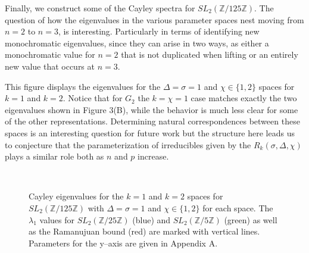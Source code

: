 \documentclass[12pt,reqno]{amsart}
\theoremstyle{remark}
\numberwithin{table}{section}
\newcommand{\Z}{\mathbb Z}
\begin{document}
%
%
% 
%



Finally, we construct some of the Cayley spectra for $SL_2(\Z /125 \Z)$. The question of how the eigenvalues in the various parameter spaces nest moving from $n=2$ to $n=3$, is interesting.  Particularly in terms of identifying new monochromatic eigenvalues, since they can arise in two ways, as either   a monochromatic value for $n=2$ that is not duplicated when lifting or an entirely new value that occurs at $n=3$. 

This figure displays the eigenvalues for the $\Delta=\sigma=1$ and $\chi\in\{1,2\}$ spaces for $k=1$ and $k=2$. Notice that for $G_2$ the $k=\chi=1$ case matches exactly the two eigenvalues shown in Figure 3(B), while the behavior is much less clear for some of the other representations. Determining natural correspondences between these spaces is an interesting question for future work but the structure here leads us to conjecture that the parameterization of irreducibles given by the $R_k(\sigma, \Delta, \chi)$ plays a similar role both as $n$ and $p$ increase. 


\begin{figure}[!h]

\\
\caption{Cayley eigenvalues for the $k=1$ and $k=2$ spaces for   $SL_2(\Z /125 \Z)$ with $\Delta=\sigma=1$ and $\chi\in\{1,2\}$ for each space. The $\lambda_1$ values for $SL_2(\Z /25 \Z)$ (blue) and $SL_2(\Z /5 \Z)$ (green) as well as the Ramanujuan bound (red) are marked with vertical lines.  Parameters for the y--axis are given in Appendix A. }
\end{figure}
\end{document}
